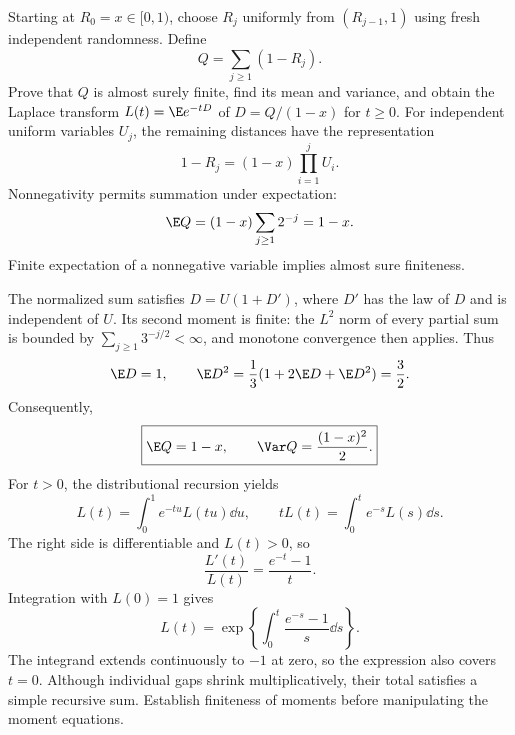Starting at $R_0=x\in[0,1)$, choose $R_j$ uniformly from $(R_{j-1},1)$ using fresh independent randomness. Define
\[
Q=\sum_{j\ge1}(1-R_j).
\]
Prove that $Q$ is almost surely finite, find its mean and variance, and obtain the Laplace transform $L(t)=\E e^{-tD}$ of $D=Q/(1-x)$ for $t\ge0$.
\solution For independent uniform variables $U_j$, the remaining distances have the representation
\[
1-R_j=(1-x)\prod_{i=1}^jU_i.
\]
Nonnegativity permits summation under expectation:
\[
\E Q=(1-x)\sum_{j\ge1}2^{-j}=1-x.
\]
Finite expectation of a nonnegative variable implies almost sure finiteness.

The normalized sum satisfies $D=U(1+D')$, where $D'$ has the law of $D$ and is independent of $U$. Its second moment is finite: the $L^2$ norm of every partial sum is bounded by $\sum_{j\ge1}3^{-j/2}<\infty$, and monotone convergence then applies. Thus
\[
\E D=1,\qquad
\E D^2=\frac13(1+2\E D+\E D^2)=\frac32.
\]
Consequently,
\[
\boxed{\E Q=1-x,\qquad \Var Q=\frac{(1-x)^2}{2}.}
\]
For $t>0$, the distributional recursion yields
\[
L(t)=\int_0^1e^{-tu}L(tu)\dd u,
\qquad tL(t)=\int_0^te^{-s}L(s)\dd s.
\]
The right side is differentiable and $L(t)>0$, so
\[
\frac{L'(t)}{L(t)}=\frac{e^{-t}-1}{t}.
\]
Integration with $L(0)=1$ gives
\[
\boxed{L(t)=\exp\!\left\{\int_0^t\frac{e^{-s}-1}{s}\dd s\right\}.}
\]
The integrand extends continuously to $-1$ at zero, so the expression also covers $t=0$.
\insight Although individual gaps shrink multiplicatively, their total satisfies a simple recursive sum. Establish finiteness of moments before manipulating the moment equations.
